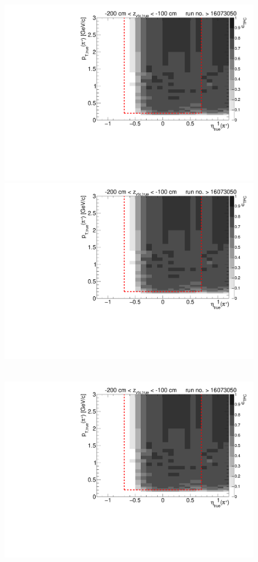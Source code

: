 \begin{figure}[hb]
{		\includegraphics[width=\linewidth,page=7]{graphics/eff/Eff2D_TPC_pion_Plus_RunRange2.pdf}\\
		\includegraphics[width=\linewidth,page=9]{graphics/eff/Eff2D_TPC_pion_Plus_RunRange2.pdf}
	}~
	\parbox{0.495\textwidth}{
		\centering
		\includegraphics[width=\linewidth,page=4]{graphics/eff/Eff2D_TPC_pion_Plus_RunRange2.pdf}\\
}
\end{figure}
